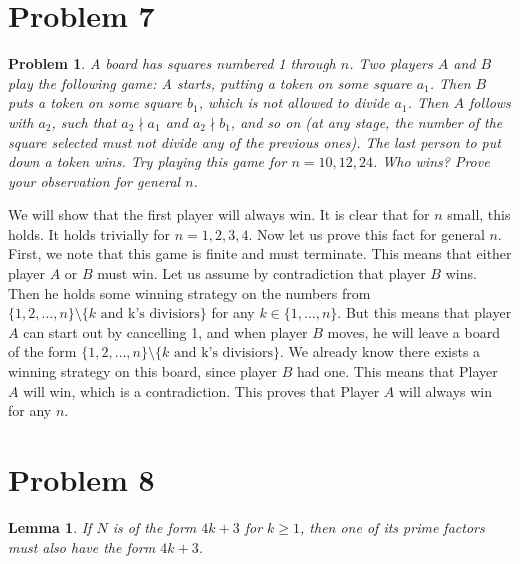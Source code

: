 \documentclass[psamsfonts]{amsart}
\newtheorem{prob}{Problem}[section]
\newtheorem{lem}[thm]{Lemma}
\newenvironment{sol}{{\bfseries Solution}}{\qedsymbol}
\theoremstyle{definition}
\theoremstyle{remark}
\numberwithin{equation}{section}
\begin{document}
\section{Problem 7}

\begin{prob}
A board has squares numbered 1 through $n$. Two players $A$ and $B$ play the following game:
A starts, putting a token on some square $a_1$. Then $B$ puts a token on some square $b_1$, which
is not allowed to divide $a_1$. Then $A$ follows with $a_2$, such that $a_2 \nmid a_1$ and $a_2  \nmid b_1$, and so on
(at any stage, the number of the square selected must not divide any of the previous ones).
The last person to put down a token wins. Try playing this game for $n = 10, 12, 24$. Who
wins? Prove your observation for general $n$.
\end{prob}

\begin{sol}
We will show that the first player will always win. It is clear that for $n$ small, this holds. It holds trivially for $n=1, 2, 3,4$. Now let us prove this fact for general $n$. First, we note that this game is finite and must terminate. This means that either player $A$ or $B$ must win. Let us assume by contradiction that player $B$ wins. Then he holds some winning strategy on the numbers from $\{1, 2, \ldots, n \} \setminus \{k \text{ and k's divisiors} \}$ for any $k \in \{1, \ldots, n\}$. But this means that player $A$ can start out by cancelling 1, and when player $B$ moves, he will leave a board of the form $\{1, 2, \ldots, n \} \setminus \{k \text{ and k's divisiors} \}$. We already know there exists a winning strategy on this board, since player $B$ had one. This means that Player $A$ will win, which is a contradiction. This proves that Player $A$ will always win for any $n$.
\end{sol}

\section{Problem 8}

\begin{lem}
If $N$ is of the form $4k+3$ for $k \geq 1$, then one of its prime factors must also have the form $4k + 3$.  
\end{lem}
\end{document}
